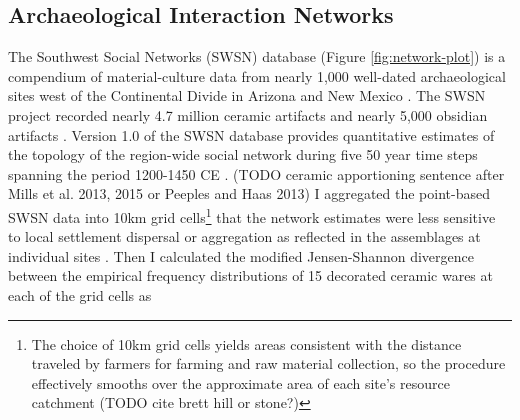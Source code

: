 \documentclass[11pt]{iopart}
\begin{document}
\subsection*{Archaeological Interaction Networks}
The Southwest Social Networks (SWSN) database (Figure \ref{fig:network-plot}) is a compendium of material-culture data from nearly 1,000 well-dated archaeological sites west of the Continental Divide in Arizona and New Mexico \parencite{Mills2012,Mills2013a,Peeples2013,Borck2015,Hill2015,Mills2015a}. The SWSN project recorded nearly 4.7 million ceramic artifacts and nearly 5,000 obsidian artifacts \parencite{Mills2015a}. Version 1.0 of the SWSN database provides quantitative estimates of the topology of the region-wide social network during five 50 year time steps spanning the period 1200-1450 CE \parencite{Mills2013a}. (TODO ceramic apportioning sentence after  Mills et al. 2013, 2015 or Peeples and Haas 2013) I aggregated the point-based SWSN data into 10km grid cells\footnote{The choice of 10km grid cells yields areas consistent with the distance traveled by farmers for farming and raw material collection, so the procedure effectively smooths over the approximate area of each site's resource catchment \parencite{Varien1999} (TODO cite brett hill or stone?)} that the network estimates were less sensitive to local settlement dispersal or aggregation as reflected in the assemblages at individual sites \parencite{Paliou2016}. Then I calculated the modified Jensen-Shannon divergence between the empirical frequency distributions of 15 decorated ceramic wares at each of the grid cells as
\end{document}
